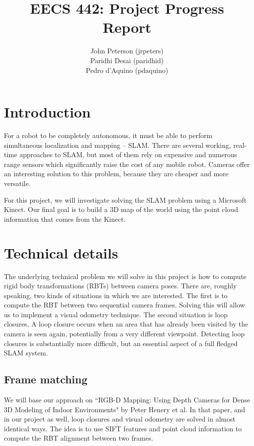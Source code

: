 \documentclass[12pt]{article}
\title{EECS 442: Project Progress Report}
\author{
	John Peterson (jrpeters)\\
	Paridhi Desai (paridhid)\\
	Pedro d'Aquino (pdaquino)}
\begin{document}
\maketitle

\section{Introduction}
For a robot to be completely autonomous, it must be able to perform simultaneous localization and
mapping -- SLAM. There are several working, real-time approaches to SLAM, but most of them
rely on expensive and numerous range sensors which significantly raise the cost of any mobile robot. Cameras
offer an interesting solution to this problem, because they are cheaper and more versatile.

For this project, we will investigate solving the SLAM problem using a Microsoft Kinect. Our final goal is
to build a 3D map of the world using the point cloud information that comes from the Kinect.

\section{Technical details}
The underlying technical problem we will solve in this project is how to compute rigid body transformations (RBTs) between camera poses. There are, roughly speaking, two kinds of situations in which we are interested. The first is to compute the RBT between two sequential camera frames. Solving this will allow us to implement a visual odometry technique. The second situation is loop closures. A loop closure occurs when an area that has already been visited by the camera is seen again, potentially from a very different viewpoint. Detecting loop closures is substantially more difficult, but an essential aspect of a full fledged SLAM system.

\subsection{Frame matching}
We will base our approach on ``RGB-D Mapping: Using Depth Cameras for Dense 3D Modeling of Indoor Environments" by Peter Henery et al. In that paper, and in our project as well, loop closures and visual odometry are solved in almost identical ways. The idea is to use SIFT features and point cloud information to compute the RBT alignment between two frames.
\end{document}
